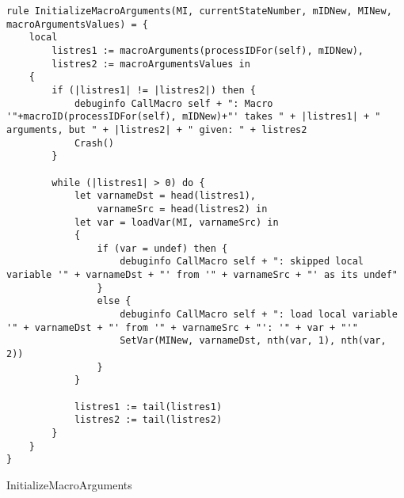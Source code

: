 \begin{listing}[H]
\begin{verbatim}
rule InitializeMacroArguments(MI, currentStateNumber, mIDNew, MINew, macroArgumentsValues) = {
    local
        listres1 := macroArguments(processIDFor(self), mIDNew),
        listres2 := macroArgumentsValues in
    {
        if (|listres1| != |listres2|) then {
            debuginfo CallMacro self + ": Macro '"+macroID(processIDFor(self), mIDNew)+"' takes " + |listres1| + " arguments, but " + |listres2| + " given: " + listres2
            Crash()
        }

        while (|listres1| > 0) do {
            let varnameDst = head(listres1),
                varnameSrc = head(listres2) in
            let var = loadVar(MI, varnameSrc) in
            {
                if (var = undef) then {
                    debuginfo CallMacro self + ": skipped local variable '" + varnameDst + "' from '" + varnameSrc + "' as its undef"
                }
                else {
                    debuginfo CallMacro self + ": load local variable '" + varnameDst + "' from '" + varnameSrc + "': '" + var + "'"
                    SetVar(MINew, varnameDst, nth(var, 1), nth(var, 2))
                }
            }

            listres1 := tail(listres1)
            listres2 := tail(listres2)
        }
    }
}
\end{verbatim}
\caption{InitializeMacroArguments}
\label{lst:asm:InitializeMacroArguments}
\end{listing}




